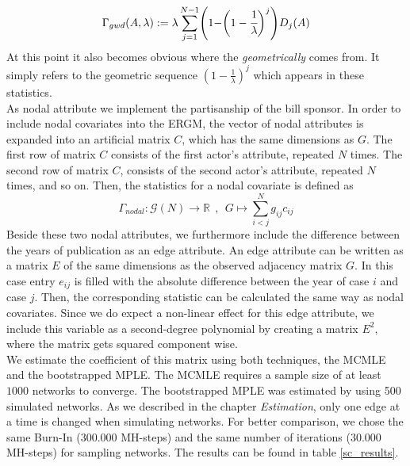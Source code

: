 \documentclass[headsepline=true, abstracton]{scrartcl}
\begin{document}
\begin{equation}
\Gamma_{gwd}(A,\lambda):= \lambda\sum_{j=1}^{N-1}\Biggr(1- \biggr(1-\cfrac{1}{\lambda}\biggl)^j\Biggl)D_j(A)
\end{equation}
At this point it also becomes obvious where the \textit{geometrically} comes from. It simply refers to the geometric sequence $(1-\frac{1}{\lambda})^j$ which appears in these statistics.\\[0.3cm]
As nodal attribute we implement the partisanship of the bill sponsor. In order to include nodal covariates into the ERGM, the vector of nodal attributes is expanded into an artificial matrix $C$, which has the same dimensions as $G$. The first row of matrix $C$ consists of the first actor's attribute, repeated $N$ times. The second row of matrix $C$, consists of the second actor's attribute, repeated $N$ times, and so on. Then, the statistics for a nodal covariate is defined as
$$\Gamma_{nodal}: \mathcal{G}(N) \to \mathbb{R}~~,~~G \mapsto \sum_{i<j}^{N}g_{ij}c_{ij}$$
Beside these two nodal attributes, we furthermore include the difference between the years of publication as an edge attribute. An edge attribute can be written as a matrix $E$ of the same dimensions as the observed adjacency matrix $G$. In this case entry $e_{ij}$ is filled with the absolute difference between the year of case $i$ and case $j$. Then, the corresponding statistic can be calculated the same way as nodal covariates. Since we do expect a non-linear effect for this edge attribute, we include this variable as a second-degree polynomial by creating a matrix $E^2$, where the matrix gets squared component wise.\\[0.3cm]
We estimate the coefficient of this matrix using both techniques, the MCMLE and the bootstrapped MPLE. The MCMLE requires a sample size of at least $1000$ networks to converge. The bootstrapped MPLE was estimated by using 500 simulated networks. As we described in the chapter {\it Estimation}, only one edge at a time is changed when simulating networks. For better comparison, we chose the same Burn-In ($300.000$ MH-steps) and the same number of iterations ($30.000$ MH-steps) for sampling networks. The results can be found in table \ref{sc_results}.\\[0.3cm]
\end{document}
